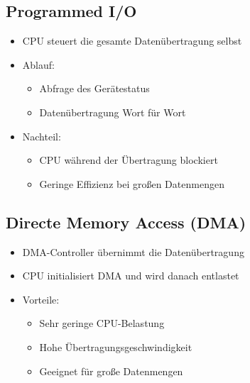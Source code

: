 \documentclass{kit}
\begin{document}
  \subsection{Programmed I/O}
    \begin{itemize}
      \item CPU steuert die gesamte Datenübertragung selbst
      \item Ablauf:
        \begin{itemize}
          \item Abfrage des Gerätestatus
          \item Datenübertragung Wort für Wort
        \end{itemize}
      \item Nachteil:
        \begin{itemize}
          \item CPU während der Übertragung blockiert
          \item Geringe Effizienz bei großen Datenmengen
        \end{itemize}
    \end{itemize}
  \subsection{Directe Memory Access (DMA)}
    \begin{itemize}
      \item DMA-Controller übernimmt die Datenübertragung
      \item CPU initialisiert DMA und wird danach entlastet
      \item Vorteile:
        \begin{itemize}
          \item Sehr geringe CPU-Belastung
          \item Hohe Übertragungsgeschwindigkeit
          \item Geeignet für große Datenmengen
        \end{itemize}
    \end{itemize}
\end{document}
